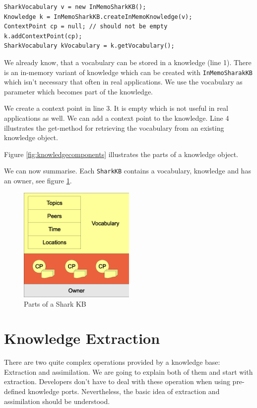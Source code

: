 \begin{verbatim}
SharkVocabulary v = new InMemoSharkKB();
Knowledge k = InMemoSharkKB.createInMemoKnowledge(v);
ContextPoint cp = null; // should not be empty
k.addContextPoint(cp);
SharkVocabulary kVocabulary = k.getVocabulary();
\end{verbatim}

We already know, that a vocabulary can be stored in a knowledge (line 1). There is an in-memory variant of knowledge which can be created with {\tt InMemoSharakKB} which isn't necessary that often in real applications. We use the vocabulary as parameter which becomes part of the knowledge.

We create a context point in line 3. It is empty which is not useful in real applications as well. We can add a context point to the knowledge. Line 4 illustrates the get-method for retrieving the vocabulary from an existing knowledge object.

Figure \ref{fig:knowledgecomponents} illustrates the parts of a knowledge object.


We can now summarise. Each {\tt SharkKB} contains a vocabulary, knowledge and has an owner, see figure \ref{fig:sharkkbcontent}.

\begin{figure}[t]
\centering
\includegraphics[width=0.50\textwidth]{sharkkbcontent.eps}
\caption{Parts of a Shark KB}
\label{fig:sharkkbcontent}
\end{figure}

\section{Knowledge Extraction}
\label{sec:extraction}
There are two quite complex operations provided by a knowledge base: Extraction and assimilation. We are going to explain both of them and start with extraction. Developers don't have to deal with these operation when using pre-defined knowledge ports. Nevertheless, the basic idea of extraction and assimilation should be understood.

